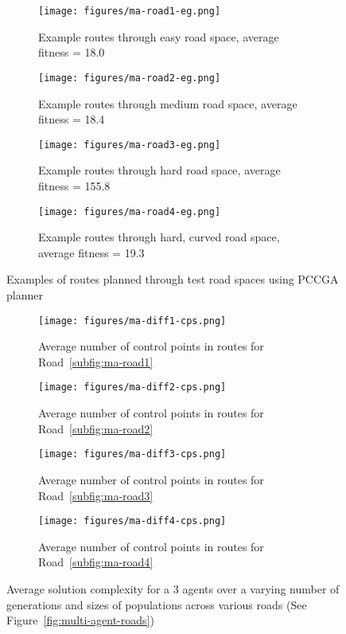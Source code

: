 \begin{figure}
  \centering
  \begin{subfigure}[b]{0.44\textwidth}
    \centering
    \texttt{[image: figures/ma-road1-eg.png]}
    \caption{\label{subfig:ma-road1-eg}Example routes through easy road space, average fitness = 18.0 }
  \end{subfigure}
  \begin{subfigure}[b]{0.44\textwidth}
    \centering
    \texttt{[image: figures/ma-road2-eg.png]}
    \caption{\label{subfig:ma-road2-eg}Example routes through medium road space, average fitness = 18.4 }
  \end{subfigure}
  \begin{subfigure}[b]{0.44\textwidth}
    \centering
    \texttt{[image: figures/ma-road3-eg.png]}
    \caption{\label{subfig:ma-road3-eg}Example routes through hard road space, average fitness = 155.8}
  \end{subfigure}
  \begin{subfigure}[b]{0.44\textwidth}
    \centering
    \texttt{[image: figures/ma-road4-eg.png]}
    \caption{\label{subfig:ma-road4-eg}Example routes through hard, curved road space, average fitness = 19.3 }
  \end{subfigure}
  \caption{\label{fig:multi-agent-roads-egs} Examples of routes planned through test road spaces using PCCGA planner}
\end{figure}

\begin{figure}
  \centering
  \begin{subfigure}[b]{0.44\textwidth}
    \centering
    \texttt{[image: figures/ma-diff1-cps.png]}
    \caption{\label{subfig:ma-diff1-cps}Average number of control points in routes for Road~\ref{subfig:ma-road1}}
  \end{subfigure}
  \begin{subfigure}[b]{0.44\textwidth}
    \centering
    \texttt{[image: figures/ma-diff2-cps.png]}
    \caption{\label{subfig:ma-diff2-cps}Average number of control points in routes for Road~\ref{subfig:ma-road2}}
  \end{subfigure}
  \begin{subfigure}[b]{0.44\textwidth}
    \centering
    \texttt{[image: figures/ma-diff3-cps.png]}
    \caption{\label{subfig:ma-diff3-cps}Average number of control points in routes for Road~\ref{subfig:ma-road3}}
  \end{subfigure}
  \begin{subfigure}[b]{0.44\textwidth}
    \centering
    \texttt{[image: figures/ma-diff4-cps.png]}
    \caption{\label{subfig:ma-diff4-cps}Average number of control points in routes for Road~\ref{subfig:ma-road4}}
  \end{subfigure}
  \caption{\label{fig:multi-agent-cps} Average solution complexity for a 3 agents over a varying number of generations and sizes of populations across various roads (See Figure~\ref{fig:multi-agent-roads}) }
\end{figure}


